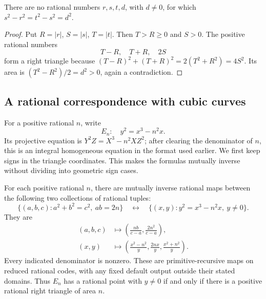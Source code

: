 \begin{corollary}\label{cor:square-progression}
There are no rational numbers $r,s,t,d$, with $d\ne0$, for which
$s^2-r^2=t^2-s^2=d^2$.
\end{corollary}

\begin{proof}
Put $R=|r|$, $S=|s|$, $T=|t|$.  Then $T>R\geq0$ and $S>0$.
The positive rational numbers
\[
  T-R,\quad T+R,\quad 2S
\]
form a right triangle because
$(T-R)^2+(T+R)^2=2(T^2+R^2)=4S^2$.
Its area is $(T^2-R^2)/2=d^2>0$, again a contradiction.
\end{proof}

\subsection{A rational correspondence with cubic curves}

For a positive rational $n$, write
\[
 E_n:\quad y^2=x^3-n^2x.
\]
Its projective equation is $Y^2Z=X^3-n^2XZ^2$; after clearing the denominator
of $n$, this is an integral homogeneous equation in the format used earlier.
We first keep signs in the triangle coordinates.  This makes the formulas
mutually inverse without dividing into geometric sign cases.

\begin{theorem}\label{thm:En-correspondence}
For each positive rational $n$, there are mutually inverse rational maps
between the following two collections of rational tuples:
\[
 \{(a,b,c):a^2+b^2=c^2,\ ab=2n\}
 \quad\longleftrightarrow\quad
 \{(x,y):y^2=x^3-n^2x,\ y\ne0\}.
\]
They are
\begin{align}
 (a,b,c)&\longmapsto
   \left(\frac{nb}{c-a},\frac{2n^2}{c-a}\right),
   \label{eq:triangle-to-curve}\\
 (x,y)&\longmapsto
   \left(\frac{x^2-n^2}{y},\frac{2nx}{y},
                     \frac{x^2+n^2}{y}\right).
   \label{eq:curve-to-triangle}
\end{align}
Every indicated denominator is nonzero.  These are primitive-recursive maps
on reduced rational codes, with any fixed default output outside their stated
domains.  Thus $E_n$ has a rational point with $y\ne0$ if and only if there
is a positive rational right triangle of area $n$.
\end{theorem}

